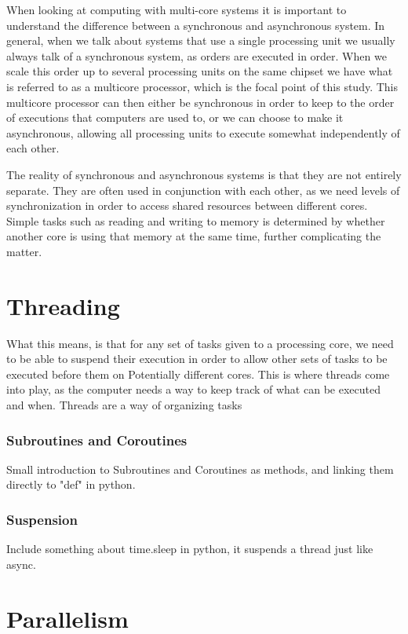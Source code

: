 \documentclass{article}
\begin{document}
When looking at computing with multi-core systems it is important to understand the difference between a synchronous and asynchronous system. In general, when we talk about systems that use a single processing unit we usually always talk of a synchronous system, as orders are executed in order. When we scale this order up to several processing units on the same chipset we have what is referred to as a multicore processor, which is the focal point of this study. This multicore processor can then either be synchronous in order to keep to the order of executions that computers are used to, or we can choose to make it asynchronous, allowing all processing units to execute somewhat independently of each other. 

The reality of synchronous and asynchronous systems is that they are not entirely separate. They are often used in conjunction with each other, as we need levels of synchronization in order to access shared resources between different cores. Simple tasks such as reading and writing to memory is determined by whether another core is using that memory at the same time, further complicating the matter.

\section{Threading}

What this means, is that for any set of tasks given to a processing core, we need to be able to suspend their execution in order to allow other sets of tasks to be executed before them on Potentially different cores. This is where threads come into play, as the computer needs a way to keep track of what can be executed and when. Threads are a way of organizing tasks

\subsubsection{Subroutines and Coroutines}

Small introduction to Subroutines and Coroutines as methods, and linking them directly to "def" in python.

\subsubsection{Suspension}

Include something about time.sleep in python, it suspends a thread just like async.

\section{Parallelism}
\end{document}
